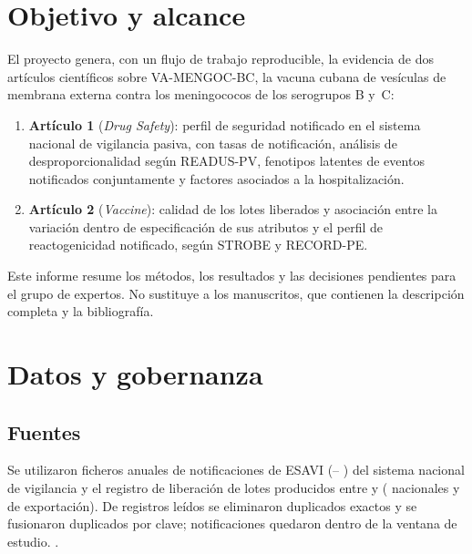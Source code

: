 \documentclass[11pt]{article}
\begin{document}
\section{Objetivo y alcance}
El proyecto genera, con un flujo de trabajo reproducible, la evidencia de dos artículos científicos
sobre VA-MENGOC-BC, la vacuna cubana de vesículas de membrana externa contra los meningococos de los
serogrupos B y~C:
\begin{enumerate}[leftmargin=*]
\item \textbf{Artículo 1} (\emph{Drug Safety}): perfil de seguridad notificado en el sistema nacional
  de vigilancia pasiva, con tasas de notificación, análisis de desproporcionalidad según READUS-PV,
  fenotipos latentes de eventos notificados conjuntamente y factores asociados a la hospitalización.
\item \textbf{Artículo 2} (\emph{Vaccine}): calidad de los lotes liberados y asociación entre la
  variación dentro de especificación de sus atributos y el perfil de reactogenicidad notificado,
  según STROBE y RECORD-PE.
\end{enumerate}
Este informe resume los métodos, los resultados y las decisiones pendientes para el grupo de
expertos. No sustituye a los manuscritos, que contienen la descripción completa y la bibliografía.

\section{Datos y gobernanza}
\subsection{Fuentes}
Se utilizaron \VNFiles{} ficheros anuales de notificaciones de ESAVI (\VStudyFirstYear--%
\VStudyLastYear) del sistema nacional de vigilancia y el registro de liberación de \PTNLots{} lotes
producidos entre \PTLotFirstYear{} y \PTLotLastYear{} (\PTNNationalLots{} nacionales y
\PTNExportLots{} de exportación). De \VReportsRaw{} registros leídos se eliminaron
\VExactDuplicates{} duplicados exactos y se fusionaron \VKeyDuplicatesMerged{} duplicados por clave;
\VReportsInWindow{} notificaciones quedaron dentro de la ventana de estudio. \VFormSentence.
\end{document}
